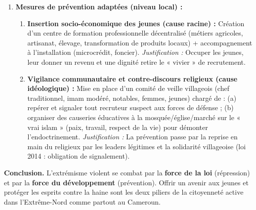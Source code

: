 \documentclass[11pt]{article}
\begin{document}
\begin{exoresolu}
\begin{enumerate}
\begin{enumerate}
\end{enumerate}
\item \textbf{Mesures de prévention adaptées (niveau local) :}
\begin{enumerate}
\item \textbf{Insertion socio-économique des jeunes (cause racine) :} Création d'un centre de formation professionnelle décentralisé (métiers agricoles, artisanat, élevage, transformation de produits locaux) + accompagnement à l'installation (microcrédit, foncier). \emph{Justification :} Occuper les jeunes, leur donner un revenu et une dignité retire le « vivier » de recrutement.
\item \textbf{Vigilance communautaire et contre-discours religieux (cause idéologique) :} Mise en place d'un comité de veille villageois (chef traditionnel, imam modéré, notables, femmes, jeunes) chargé de : (a) repérer et signaler tout recruteur suspect aux forces de défense ; (b) organiser des causeries éducatives à la mosquée/église/marché sur le « vrai islam » (paix, travail, respect de la vie) pour démonter l'endoctrinement. \emph{Justification :} La prévention passe par la reprise en main du religieux par les leaders légitimes et la solidarité villageoise (loi 2014 : obligation de signalement).
\end{enumerate}
\end{enumerate}
\textbf{Conclusion.} L'extrémisme violent se combat par la \textbf{force de la loi} (répression) et par la \textbf{force du développement} (prévention). Offrir un avenir aux jeunes et protéger les esprits contre la haine sont les deux piliers de la citoyenneté active dans l'Extrême-Nord comme partout au Cameroun.
\end{exoresolu}
\end{document}

